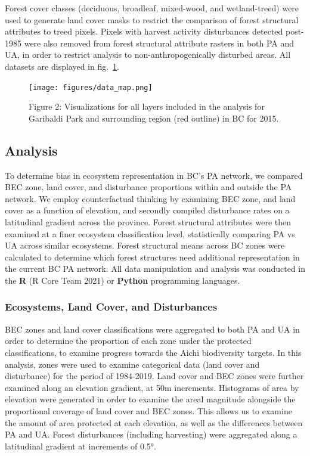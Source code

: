 \documentclass[10pt,oneside]{article}
\begin{document}
Forest cover classes (deciduous, broadleaf, mixed-wood, and
wetland-treed) were used to generate land cover masks to restrict the
comparison of forest structural attributes to treed pixels. Pixels with
harvest activity disturbances detected post-1985 were also removed from
forest structural attribute rasters in both PA and UA, in order to
restrict analysis to non-anthropogenically disturbed areas. All datasets
are displayed in fig.~\ref{fig:data-fig}.

\begin{figure}
\hypertarget{fig:data-fig}{%
\centering
\texttt{[image: figures/data\_map.png]}
\caption{Figure 2: Visualizations for all layers included in the
analysis for Garibaldi Park and surrounding region (red outline) in BC
for 2015.}\label{fig:data-fig}
}
\end{figure}

\hypertarget{analysis}{%
\subsection{Analysis}\label{analysis}}

To determine bias in ecosystem representation in BC's PA network, we
compared BEC zone, land cover, and disturbance proportions within and
outside the PA network. We employ counterfactual thinking by examining
BEC zone, and land cover as a function of elevation, and secondly
compiled disturbance rates on a latitudinal gradient across the
province. Forest structural attributes were then examined at a finer
ecosystem classification level, statistically comparing PA vs UA across
similar ecosystems. Forest structural means across BC zones were
calculated to determine which forest structures need additional
representation in the current BC PA network. All data manipulation and
analysis was conducted in the \textbf{R} (R Core Team 2021) or
\textbf{Python} programming languages.

\hypertarget{ecosystems-land-cover-and-disturbances}{%
\subsubsection{Ecosystems, Land Cover, and
Disturbances}\label{ecosystems-land-cover-and-disturbances}}

BEC zones and land cover classifications were aggregated to both PA and
UA in order to determine the proportion of each zone under the protected
classifications, to examine progress towards the Aichi biodiversity
targets. In this analysis, zones were used to examine categorical data
(land cover and disturbance) for the period of 1984-2019. Land cover and
BEC zones were further examined along an elevation gradient, at 50m
increments. Histograms of area by elevation were generated in order to
examine the areal magnitude alongside the proportional coverage of land
cover and BEC zones. This allows us to examine the amount of area
protected at each elevation, as well as the differences between PA and
UA. Forest disturbances (including harvesting) were aggregated along a
latitudinal gradient at increments of 0.5°.
\end{document}
